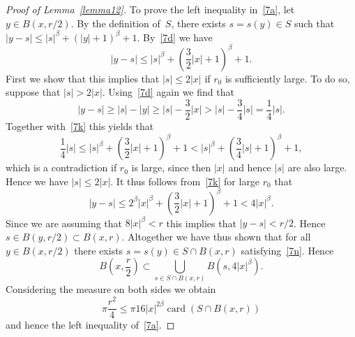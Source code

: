 \documentclass[12pt,a4paper]{amsart}
\theoremstyle{plain}
\theoremstyle{definition}
\theoremstyle{remark}
\def\card{\operatorname{card}}
\numberwithin{equation}{section}
\begin{document}
\begin{proof}[Proof of Lemma~\ref{lemma12}]
To prove the left inequality in~\eqref{7a}, let $y\in B(x,r/2)$.
By the definition of~$S$, there exists $s=s(y)\in S$ such that 
$|y-s|\leq |s|^\beta+(|y|+1)^\beta +1$.
By~\eqref{7d} we have 
\begin{equation}\label{7k}
|y-s|\leq |s|^\beta+\left(\frac32 |x|+1\right)^\beta +1 .
\end{equation}
First we show that this implies that $|s|\leq 2|x|$ if $r_0$ is sufficiently large.
To do so, suppose that $|s|>2|x|$.
Using~\eqref{7d} again we find that 
\begin{equation}\label{7l}
|y-s|\geq |s|-|y|\geq |s|-\frac32 |x|> |s|-\frac34|s|=\frac14|s|.
\end{equation}
Together with~\eqref{7k} this yields that
\begin{equation}\label{7m}
\frac14|s|\leq |s|^\beta+\left(\frac32 |x|+1\right)^\beta +1
< |s|^\beta+\left(\frac34 |s|+1\right)^\beta +1,
\end{equation}
which is a contradiction if $r_0$ is large,
since then $|x|$ and hence $|s|$ are also large.
Hence we have $|s|\leq 2|x|$.
It thus follows from~\eqref{7k} for large $r_0$ that
\begin{equation}\label{7n}
|y-s|\leq 2^\beta |x|^\beta + \left(\frac32 |x|+1\right)^\beta +1< 4|x|^\beta .
\end{equation}
Since we are assuming that $8|x|^\beta<r$ this implies that $|y-s|<r/2$.
Hence $s\in B(y,r/2)\subset B(x,r)$.
Altogether we have thus shown that
 for all $y\in B(x,r/2)$ there exists $s=s(y)\in S\cap B(x,r)$ satisfying~\eqref{7n}.
Hence
\begin{equation}\label{7o}
B\!\left(x,\frac{r}{2}\right) \subset 
\bigcup_{s\in S\cap B(x,r)} B(s,4|x|^\beta).
\end{equation}
Considering the measure on both sides we obtain
\begin{equation}\label{7p}
\pi \frac{r^2}{4} \leq \pi 16 |x|^{2\beta} \card(S\cap B(x,r))
\end{equation}
and hence the left inequality of~\eqref{7a}.


\end{proof}
\end{document}

